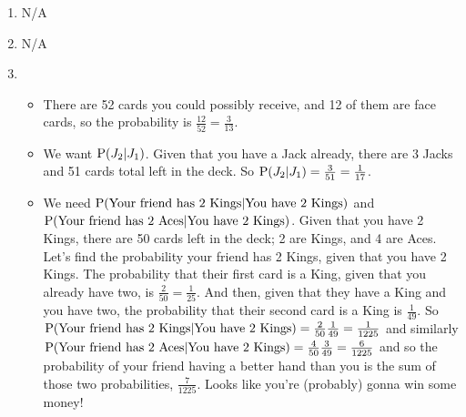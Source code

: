 \documentclass[12pt]{article}
\newcommand{\Pp}{\emph{\emph{P}}}
\begin{document}
\begin{enumerate}
	\item N/A
	\item N/A
	\item
	\begin{itemize}
		\item There are 52 cards you could possibly receive, and 12 of them are face cards, so the probability is $\frac{12}{52} = \frac{3}{13}$.
		\item We want $\Pp(J_2 | J_1)$. Given that you have a Jack already, there are 3 Jacks and 51 cards total left in the deck. So $\Pp(J_2 | J_1) = \frac{3}{51} = \frac{1}{17}$.
		\item We need $\Pp(\text{Your friend has 2 Kings} | \text{You have 2 Kings})$ and \\ $\Pp(\text{Your friend has 2 Aces} | \text{You have 2 Kings})$. Given that you have 2 Kings, there are 50 cards left in the deck; 2 are Kings, and 4 are Aces. Let's find the probability your friend has 2 Kings, given that you have 2 Kings. The probability that their first card is a King, given that you already have two, is $\frac{2}{50} = \frac{1}{25}$. And then, given that they have a King and you have two, the probability that their second card is a King is $\frac{1}{49}$. So $\Pp(\text{Your friend has 2 Kings} | \text{You have 2 Kings}) = \frac{2}{50} \frac{1}{49} = \frac{1}{1225}$ and similarly $\Pp(\text{Your friend has 2 Aces} | \text{You have 2 Kings}) = \frac{4}{50} \frac{3}{49} = \frac{6}{1225}$ and so the probability of your friend having a better hand than you is the sum of those two probabilities, $\frac{7}{1225}$. Looks like you're (probably) gonna win some money!
	\end{itemize}
\end{enumerate}
\end{document}

